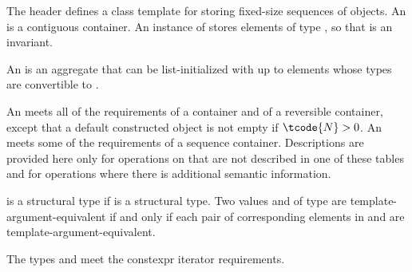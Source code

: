 \pnum
{}%
The header  defines a class template for storing fixed-size
sequences of objects.
An  is a contiguous container.
An instance of  stores  elements of type ,
so that  is an invariant.

\pnum
{}%
%
An  is an aggregate that can be
list-initialized with up
to  elements whose types are convertible to .

\pnum
{}%
An  meets all of the requirements
of a container and
of a reversible container,
except that a default
constructed  object is not empty if $\tcode{N} > 0$.
An  meets some of the requirements of a sequence
container.
Descriptions are provided here
only for operations on  that are not described in
one of these tables and
for operations where there is additional semantic information.

\pnum
{} is a structural type if
 is a structural type.
Two values  and  of type 
are template-argument-equivalent if and only if
each pair of corresponding elements in  and 
are template-argument-equivalent.

\pnum
The types  and  meet
the constexpr iterator requirements.

